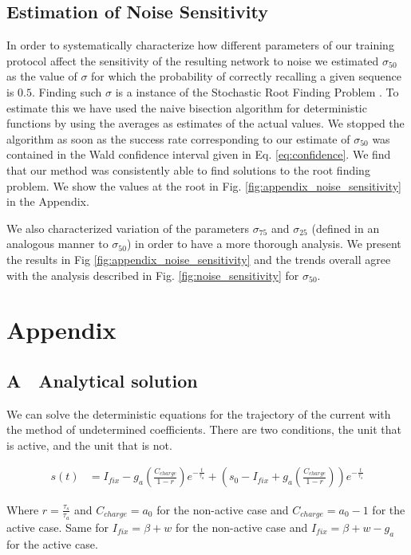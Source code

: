 \documentclass[10pt,a4paper]{article}
\begin{document}
\subsection{Estimation of Noise Sensitivity}
In order to systematically characterize how different parameters of our training protocol affect the sensitivity of the resulting network to noise we estimated $\sigma_{50}$ as the  value of $\sigma$ for which the probability of correctly recalling a given sequence is $0.5$. Finding such $\sigma$ is a instance of the Stochastic Root Finding Problem \cite{pasupathy2010choosing}. To estimate this we have used the naive bisection algorithm for deterministic functions by using the averages as estimates of the actual values. We stopped the algorithm as soon as the success rate corresponding to our estimate of $\sigma_{50}$ was contained in the Wald confidence interval given in Eq. \ref{eq:confidence}. We find that our method was consistently able to find solutions to the root finding problem. We show the values at the root in Fig. \ref{fig:appendix_noise_sensitivity} in the Appendix.

We also characterized variation of the parameters $\sigma_{75}$ and $\sigma_{25}$ (defined in an analogous manner to $\sigma_{50}$) in order to have a more thorough analysis. We present the results in Fig \ref{fig:appendix_noise_sensitivity} and the trends overall agree with the analysis described in Fig. \ref{fig:noise_sensitivity} for $\sigma_{50}$.



\section*{Appendix}
\subsection*{A $\;$ Analytical solution}
We can solve the deterministic equations for the trajectory of the current with the method of undetermined coefficients. There are two conditions, the unit that is active, and the unit that is not. 


\begin{align} 
s(t) &= I_{fix} - g_a\left(\frac{C_{charge}}{1 - r} \right) e^{-\frac{t}{\tau_a}} + \left(s_0 - I_{fix} + g_a \left( \frac{C_{charge}}{1 - r}\right)\right)e^{-\frac{t}{\tau_s}} \label{eq:deterministic_solution}
\end{align}

Where $r=\frac{\tau_s}{\tau_a}$ and $C_{charge}=a_0$ for the non-active case and $C_{charge} = a_0 - 1$ for the active case. Same for $I_{fix}=\beta + w$ for the non-active case and $I_{fix} = \beta + w - g_a$ for the active case. 
\end{document}
